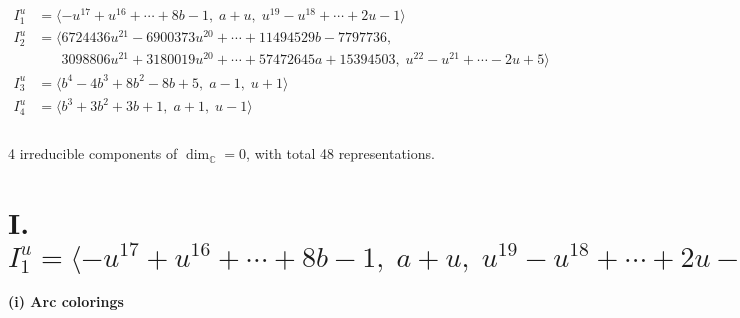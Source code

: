\documentclass[1p]{elsarticle_modified}
\theoremstyle{definition}
\begin{document}
\begin{align*}
I^u_{1}&=\langle 
- u^{17}+u^{16}+\cdots+8 b-1,\;a+u,\;u^{19}- u^{18}+\cdots+2 u-1\rangle \\
I^u_{2}&=\langle 
6724436 u^{21}-6900373 u^{20}+\cdots+11494529 b-7797736,\\
\phantom{I^u_{2}}&\phantom{= \langle  }3098806 u^{21}+3180019 u^{20}+\cdots+57472645 a+15394503,\;u^{22}- u^{21}+\cdots-2 u+5\rangle \\
I^u_{3}&=\langle 
b^4-4 b^3+8 b^2-8 b+5,\;a-1,\;u+1\rangle \\
I^u_{4}&=\langle 
b^3+3 b^2+3 b+1,\;a+1,\;u-1\rangle \\
\\
\end{align*}
\raggedright * 4 irreducible components of $\dim_{\mathbb{C}}=0$, with total 48 representations.\\
\newpage
\renewcommand{\arraystretch}{1}
\centering \section*{I. $I^u_{1}= \langle - u^{17}+u^{16}+\cdots+8 b-1,\;a+u,\;u^{19}- u^{18}+\cdots+2 u-1 \rangle$}
\flushleft \textbf{(i) Arc colorings}\\
\end{document}
